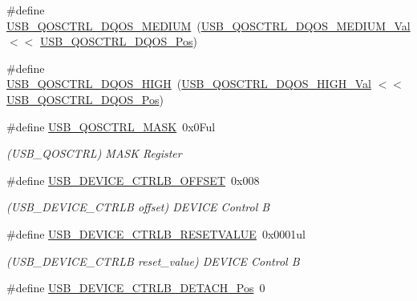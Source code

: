 \begin{DoxyCompactItemize}
\item 
\#define \mbox{\hyperlink{group___s_a_m_d21___u_s_b_ga4eba06c611c477c1e28c8d815f05e230}{U\+S\+B\+\_\+\+Q\+O\+S\+C\+T\+R\+L\+\_\+\+D\+Q\+O\+S\+\_\+\+M\+E\+D\+I\+UM}}~(\mbox{\hyperlink{group___s_a_m_d21___u_s_b_ga8cc229dafb3ee5657b7d26669744aa3f}{U\+S\+B\+\_\+\+Q\+O\+S\+C\+T\+R\+L\+\_\+\+D\+Q\+O\+S\+\_\+\+M\+E\+D\+I\+U\+M\+\_\+\+Val}}   $<$$<$ \mbox{\hyperlink{group___s_a_m_d21___u_s_b_gaaf8f4d2d3d077ae0f1c2dd8e7d950c98}{U\+S\+B\+\_\+\+Q\+O\+S\+C\+T\+R\+L\+\_\+\+D\+Q\+O\+S\+\_\+\+Pos}})
\item 
\#define \mbox{\hyperlink{group___s_a_m_d21___u_s_b_ga42a519e7b325551d3684f27ead221c7b}{U\+S\+B\+\_\+\+Q\+O\+S\+C\+T\+R\+L\+\_\+\+D\+Q\+O\+S\+\_\+\+H\+I\+GH}}~(\mbox{\hyperlink{group___s_a_m_d21___u_s_b_ga732b6db263d6ce07f943ee607edad641}{U\+S\+B\+\_\+\+Q\+O\+S\+C\+T\+R\+L\+\_\+\+D\+Q\+O\+S\+\_\+\+H\+I\+G\+H\+\_\+\+Val}}     $<$$<$ \mbox{\hyperlink{group___s_a_m_d21___u_s_b_gaaf8f4d2d3d077ae0f1c2dd8e7d950c98}{U\+S\+B\+\_\+\+Q\+O\+S\+C\+T\+R\+L\+\_\+\+D\+Q\+O\+S\+\_\+\+Pos}})
\item 
\#define \mbox{\hyperlink{group___s_a_m_d21___u_s_b_gacc526183af8e284082cf608e530c9b62}{U\+S\+B\+\_\+\+Q\+O\+S\+C\+T\+R\+L\+\_\+\+M\+A\+SK}}~0x0\+Ful
\begin{DoxyCompactList}\small\item\em (U\+S\+B\+\_\+\+Q\+O\+S\+C\+T\+RL) M\+A\+SK Register \end{DoxyCompactList}\item 
\#define \mbox{\hyperlink{group___s_a_m_d21___u_s_b_ga028b62303469fa5a44be441bedd526ee}{U\+S\+B\+\_\+\+D\+E\+V\+I\+C\+E\+\_\+\+C\+T\+R\+L\+B\+\_\+\+O\+F\+F\+S\+ET}}~0x008
\begin{DoxyCompactList}\small\item\em (U\+S\+B\+\_\+\+D\+E\+V\+I\+C\+E\+\_\+\+C\+T\+R\+LB offset) D\+E\+V\+I\+CE Control B \end{DoxyCompactList}\item 
\#define \mbox{\hyperlink{group___s_a_m_d21___u_s_b_gae17314f9012df5bc745f010f0ebbfb4c}{U\+S\+B\+\_\+\+D\+E\+V\+I\+C\+E\+\_\+\+C\+T\+R\+L\+B\+\_\+\+R\+E\+S\+E\+T\+V\+A\+L\+UE}}~0x0001ul
\begin{DoxyCompactList}\small\item\em (U\+S\+B\+\_\+\+D\+E\+V\+I\+C\+E\+\_\+\+C\+T\+R\+LB reset\+\_\+value) D\+E\+V\+I\+CE Control B \end{DoxyCompactList}\item 
\#define \mbox{\hyperlink{group___s_a_m_d21___u_s_b_gad8373344db8aa0727646a15cfc34ebd3}{U\+S\+B\+\_\+\+D\+E\+V\+I\+C\+E\+\_\+\+C\+T\+R\+L\+B\+\_\+\+D\+E\+T\+A\+C\+H\+\_\+\+Pos}}~0

\end{DoxyCompactItemize}
